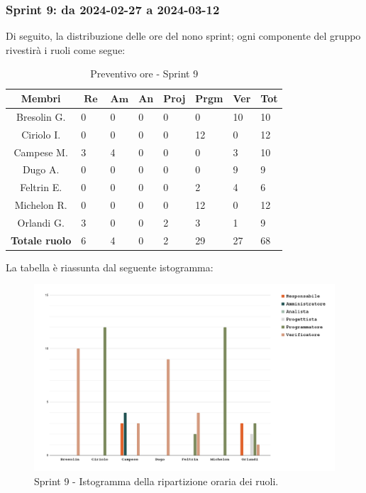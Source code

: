 \documentclass[10pt, a4paper]{article}
\begin{document}
{{{{{{{{{{{{{{{{\subsubsection{Sprint 9: da 2024-02-27 a 2024-03-12}
Di seguito, la distribuzione delle ore del nono sprint; ogni componente del gruppo rivestirà i ruoli come segue:
\begin{table}[H]
\begin{tabularx}{\textwidth}{c|X|X|X|X|X|X|X}
        \textbf{Membri} & $\operatorname{\textbf{Re}}$ & $\mathrm{\textbf{Am}}$ & \textbf{An} & \textbf{Proj} & \textbf{Prgm} & \textbf{Ver} & \textbf{Tot} \\
        \hline Bresolin G. & 0 & 0 & 0 & 0 & 0 & 10 & \cellcolor{primarycolor}10 \\
        \hline Ciriolo I.  & 0 & 0 & 0 & 0 & \cellcolor{primarycolor}12 & 0 & 12 \\
        \hline Campese M.  & 3 & \cellcolor{primarycolor}4 & 0 & 0 & 0 & 3 & 10 \\
        \hline Dugo A.     & 0 & 0 & 0 & 0 & 0 & \cellcolor{primarycolor}9 & 9 \\
        \hline Feltrin E.  & 0 & 0 & 0 & 0 & 2 & \cellcolor{primarycolor}4 & 6 \\
        \hline Michelon R. & 0 & 0 & 0 & 0 & \cellcolor{primarycolor}12 & 0 & 12 \\
        \hline Orlandi G.  & \cellcolor{primarycolor}3 & 0 & 0 & 2 & 3 & 1 & 9 \\
        \hline
        \textbf{Totale ruolo} & 6 & 4 & 0 & 2 & 29 & 27 & 68 
    \end{tabularx}
    \caption{Preventivo ore - Sprint 9}
    \end{table}

La tabella è riassunta dal seguente istogramma:
 \begin{figure}[H]
        \centering        
        \includegraphics[width=15.5cm]{istogrammi/istogramma_9_periodo.png}
        \caption{Sprint 9 - Istogramma della ripartizione oraria dei ruoli. }
    \end{figure}

}}}}}}}}}}}}}}}}
\end{document}

